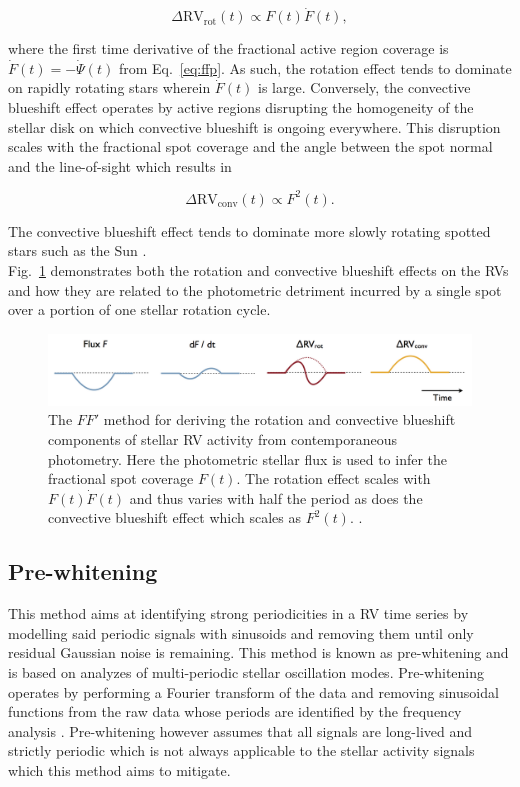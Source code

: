 \begin{equation}
  \Delta \text{RV}_{\text{rot}}(t) \propto F(t) \dot{F}(t),
\end{equation}

\noindent where the first time derivative of the fractional active region coverage is
$\dot{F}(t) = -\dot{\Psi}(t)$ from Eq.~\ref{eq:ffp}. As such, the rotation effect tends to dominate
on rapidly rotating stars wherein $\dot{F}(t)$ is large. Conversely, the convective blueshift effect
operates by active regions disrupting the homogeneity of the stellar disk on which convective
blueshift is ongoing everywhere. This disruption scales with the fractional spot coverage and
the angle between the spot normal and the line-of-sight which results in

\begin{equation}
  \Delta \text{RV}_{\text{conv}}(t) \propto F^2(t).
\end{equation}

\noindent The convective blueshift effect tends to dominate more slowly rotating spotted
stars such as the Sun \citep{haywood16}. \\

Fig.~\ref{fig:ffp} demonstrates both the rotation and
convective blueshift effects on the RVs and how they are related to the photometric detriment
incurred by a single spot over a portion of one stellar rotation cycle.

\begin{figure}
  \centering
  \includegraphics[width=0.8\hsize]{figures/ffp.png}
  \caption[Illustration of the $FF'$ method.]
      {The $FF'$ method for deriving the rotation and convective blueshift components
    of stellar RV activity from contemporaneous photometry. Here the photometric stellar flux
    is used to infer the fractional spot coverage $F(t)$. The rotation effect scales with
    $F(t) \dot{F}(t)$ and thus varies with half the period as does the convective blueshift
    effect which scales as $F^2(t)$. \citep[Image credit:][]{haywood15}.}
  \label{fig:ffp}
\end{figure}


\subsection{Pre-whitening}
This method aims at identifying strong periodicities in a RV time series by modelling
said periodic signals with sinusoids and removing them
until only residual Gaussian noise is remaining. This method is known as pre-whitening and
is based on analyzes of multi-periodic stellar oscillation modes. Pre-whitening operates
by performing a Fourier
transform of the data and removing sinusoidal functions from the raw data whose periods are
identified by the frequency analysis \citep{queloz09}. Pre-whitening however assumes that all
signals are long-lived and strictly periodic which is not always applicable to the stellar activity
signals which this method aims to mitigate.

